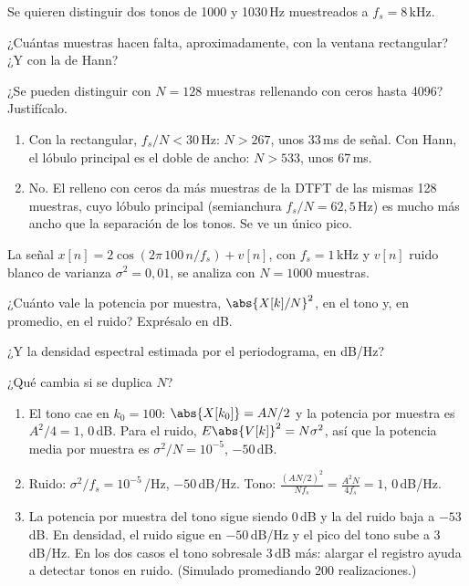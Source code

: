 \documentclass[11pt,a4paper]{scrartcl}
\begin{document}
\begin{ejercicio}[resolución]
  Se quieren distinguir dos tonos de 1000 y 1030\,Hz muestreados a $f_s=8$\,kHz.
  \begin{incisos}[1]
    \item ¿Cuántas muestras hacen falta, aproximadamente, con la ventana rectangular? ¿Y con la de Hann?
    \item ¿Se pueden distinguir con $N=128$ muestras rellenando con ceros hasta 4096? Justifícalo.
  \end{incisos}
\end{ejercicio}
\begin{solucion}
  \begin{enumerate}[label=\alph*)]
    \item Con la rectangular, $f_s/N<30$\,Hz: $N>267$, unos 33\,ms de señal. Con Hann, el lóbulo principal es el doble de ancho: $N>533$, unos 67\,ms.
    \item No. El relleno con ceros da más muestras de la DTFT de las mismas 128 muestras, cuyo lóbulo principal (semianchura $f_s/N=62{,}5$\,Hz) es mucho más ancho que la separación de los tonos. Se ve un único pico.
  \end{enumerate}
\end{solucion}

\begin{ejercicio}
  La señal $x[n]=2\cos(2\pi\,100\,n/f_s)+v[n]$, con $f_s=1$\,kHz y $v[n]$ ruido blanco de varianza $\sigma^2=0{,}01$, se analiza con $N=1000$ muestras.
  \begin{incisos}[1]
    \item ¿Cuánto vale la potencia por muestra, $\abs{X[k]/N}^2$, en el tono y, en promedio, en el ruido? Exprésalo en dB.
    \item ¿Y la densidad espectral estimada por el periodograma, en dB/Hz?
    \item ¿Qué cambia si se duplica $N$?
  \end{incisos}
\end{ejercicio}
\begin{solucion}
  \begin{enumerate}[label=\alph*)]
    \item El tono cae en $k_0=100$: $\abs{X[k_0]}=AN/2$ y la potencia por muestra es $A^2/4=1$, 0\,dB. Para el ruido, $E\abs{V[k]}^2=N\sigma^2$, así que la potencia media por muestra es $\sigma^2/N=10^{-5}$, $-50$\,dB.
    \item Ruido: $\sigma^2/f_s=10^{-5}$\,/Hz, $-50$\,dB/Hz. Tono: $\frac{(AN/2)^2}{Nf_s}=\frac{A^2N}{4f_s}=1$, 0\,dB/Hz.
    \item La potencia por muestra del tono sigue siendo 0\,dB y la del ruido baja a $-53$\,dB. En densidad, el ruido sigue en $-50$\,dB/Hz y el pico del tono sube a 3\,dB/Hz. En los dos casos el tono sobresale 3\,dB más: alargar el registro ayuda a detectar tonos en ruido. (Simulado promediando 200 realizaciones.)
  \end{enumerate}
\end{solucion}
\end{document}

